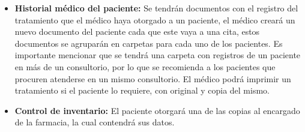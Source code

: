\begin{enumerate}
\begin{itemize}
\item \textbf{Historial médico del paciente: }Se tendrán documentos con el registro del tratamiento que el médico haya otorgado a un paciente, el médico creará un nuevo documento del paciente cada que este vaya a una cita, estos documentos se agruparán en carpetas para cada uno de los pacientes. Es importante mencionar que se tendrá una carpeta con registros de un paciente en más de un consultorio, por lo que se recomienda a los pacientes que procuren atenderse en un mismo consultorio. El médico podrá imprimir un tratamiento si el paciente lo requiere, con original y copia del mismo.\\

\item \textbf{Control de inventario: }El paciente otorgará una de las copias al encargado de la farmacia, la cual contendrá sus datos.\\


\end{itemize}
\end{enumerate}

